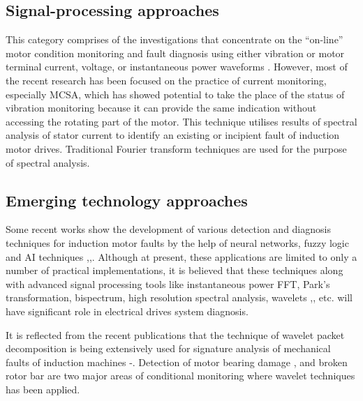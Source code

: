 \documentclass[a4paper,11pt]{report}
\begin{document}
\subsection*{Signal-processing approaches}
This category comprises of the investigations that concentrate on the ``on-line'' motor condition monitoring and fault diagnosis using either vibration \cite{rps14} or motor terminal current, voltage, or instantaneous power waveforms \cite{pbc6}. However, most of the recent research has been focused on the practice of current monitoring, especially MCSA, which has showed potential to take the place of the status of vibration monitoring \cite{00873206} because it can provide the same indication without accessing the rotating part of the motor. This technique utilises results of spectral analysis of stator current to identify an existing or incipient fault of induction motor drives. Traditional Fourier transform techniques are used for the purpose of spectral analysis.

\subsection*{Emerging technology approaches}
Some recent works show the development of various detection and diagnosis techniques for induction motor faults by the help of neural networks, fuzzy logic and AI techniques \cite{pbc2},\cite{pbc4},\cite{pbc5}. Although at present, these applications are limited to only a number of practical implementations, it is believed that these techniques along with advanced signal processing tools like instantaneous power FFT, Park's transformation, bispectrum, high resolution spectral analysis, wavelets \cite{00873206},\cite{00952496}, etc. will have significant role in electrical drives system diagnosis.
   
It is reflected from the recent publications that the technique of wavelet packet decomposition is being extensively used for signature analysis of mechanical faults of induction machines \cite{00897122}-\cite{01254628}. Detection of motor bearing damage \cite{01254628},\cite{00929510} and broken rotor bar \cite{00976461} are two major areas of conditional monitoring where wavelet techniques has been applied. 
\end{document}
